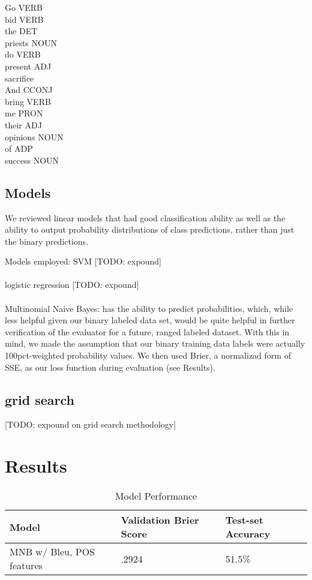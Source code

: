 \documentclass[letterpaper, 10 pt, conference]{ieeeconf}  %
\begin{document}
Go VERB  \\  
bid VERB  \\ 
the DET   \\
priests NOUN \\
do  VERB   \\
present ADJ  \\
sacrifice\\
And CCONJ \\
bring VERB  \\
me  PRON   \\
their ADJ    \\
opinions  NOUN  \\
of  ADP    \\
success NOUN \\


\subsection{Models}
We reviewed linear models that had good classification ability as well as the ability to output probability distributions of class predictions, rather than just the binary predictions.


Models employed:
SVM [TODO: expound]\\ \\
logistic regression [TODO: expound]\\ \\
Multinomial Naive Bayes:
  has the ability to predict probabilities, which, while less helpful given our binary labeled data set, would be quite helpful in further verification of the evaluator for a future, ranged labeled dataset. With this in mind, we made the assumption that our binary training data labels were actually 100pct-weighted probability values. We then used Brier, a normalizad form of SSE, as our loss function during evaluation (see Results).


  \subsection{grid search}
    [TODO: expound on grid search methodology]

  \section{Results}
    \begin{table}[h]
      \caption{Model Performance}
      \label{table_example}
      \begin{center}
        \begin{tabular}{| p{2cm}  | p{2cm} | | p{2cm} }
        \hline
        Model & Validation Brier Score & Test-set Accuracy\\
        \hline
        MNB w/ Bleu, POS features & .2924 & 51.5\%\\

        \hline
        \end{tabular}
      \end{center}
    \end{table}
\end{document}

